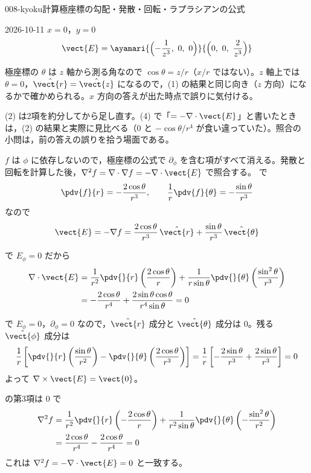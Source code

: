\documentclass[uplatex,dvipdfmx,a4paper,11pt]{jsarticle}
\begin{document}
\begin{mondai}{008-kyoku}{計算}{極座標の勾配・発散・回転・ラプラシアンの公式}
\begin{kotaeutsushi}{2026-10-11}
$x=0$，$y=0$
\[ \vect{E}=\ayamari{\Bigl(-\frac{1}{z^{3}},\ 0,\ 0\Bigr)}{\Bigl(0,\ 0,\ \frac{2}{z^{3}}\Bigr)} \]
\end{kotaeutsushi}
\begin{kizuki}
\item 極座標の $\theta$ は $z$ 軸から測る角なので $\cos\theta=z/r$（$x/r$ ではない）。$z$ 軸上では $\theta=0$，$\hat{\vect{r}}=\hat{\vect{z}}$ になるので，(1) の結果と同じ向き（$z$ 方向）になるかで確かめられる。$x$ 方向の答えが出た時点で誤りに気付ける。
\item (2) は2項を約分してから足し直す。(4) で「$=-\nabla\cdot\vect{E}$」と書いたときは，(2) の結果と実際に見比べる（$0$ と $-\cos\theta/r^{4}$ が食い違っていた）。照合の小問は，前の答えの誤りを拾う場面である。
\end{kizuki}
\begin{tadashii}
\houshin $f$ は $\phi$ に依存しないので，極座標の公式で $\partial_\phi$ を含む項がすべて消える。発散と回転を計算した後，$\nabla^2 f = \nabla\cdot\nabla f = -\nabla\cdot\vect{E}$ で照合する。
\keisan {}  で
\[ \pdv{f}{r} = -\frac{2\cos\theta}{r^3}, \qquad \frac{1}{r}\pdv{f}{\theta} = -\frac{\sin\theta}{r^3} \]
なので
\[ \vect{E} = -\nabla f = \frac{2\cos\theta}{r^3}\,\hat{\vect{r}} + \frac{\sin\theta}{r^3}\,\hat{\vect{\theta}} \]

  で $E_\phi = 0$ だから
\begin{align*}
  \nabla\cdot\vect{E} &= \frac{1}{r^2}\pdv{}{r}\left(\frac{2\cos\theta}{r}\right) + \frac{1}{r\sin\theta}\pdv{}{\theta}\left(\frac{\sin^2\theta}{r^3}\right) \\
  &= -\frac{2\cos\theta}{r^4} + \frac{2\sin\theta\cos\theta}{r^4\sin\theta} = 0
\end{align*}

  で $E_\phi = 0$，$\partial_\phi = 0$ なので，$\hat{\vect{r}}$ 成分と $\hat{\vect{\theta}}$ 成分は $0$。残る $\hat{\vect{\phi}}$ 成分は
\[ \frac{1}{r}\left[\pdv{}{r}\left(\frac{\sin\theta}{r^2}\right) - \pdv{}{\theta}\left(\frac{2\cos\theta}{r^3}\right)\right] = \frac{1}{r}\left[-\frac{2\sin\theta}{r^3} + \frac{2\sin\theta}{r^3}\right] = 0 \]
よって $\nabla\times\vect{E} = \vect{0}$。

  の第3項は $0$ で
\begin{align*}
  \nabla^2 f &= \frac{1}{r^2}\pdv{}{r}\left(-\frac{2\cos\theta}{r}\right) + \frac{1}{r^2\sin\theta}\pdv{}{\theta}\left(-\frac{\sin^2\theta}{r^2}\right) \\
  &= \frac{2\cos\theta}{r^4} - \frac{2\cos\theta}{r^4} = 0
\end{align*}
これは $\nabla^2 f = -\nabla\cdot\vect{E} = 0$ と一致する。


\end{tadashii}
\end{mondai}
\end{document}
